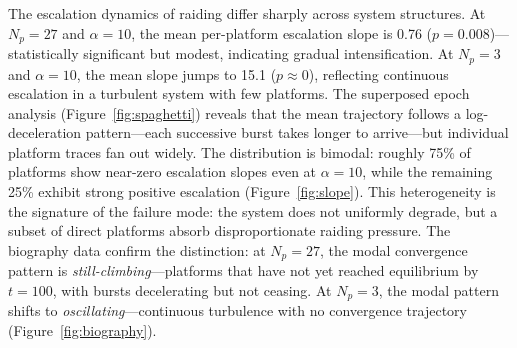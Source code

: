 
The escalation dynamics of raiding differ sharply across system structures. At $N_p = 27$ and $\alpha = 10$, the mean per-platform escalation slope is 0.76 ($p = 0.008$)---statistically significant but modest, indicating gradual intensification. At $N_p = 3$ and $\alpha = 10$, the mean slope jumps to 15.1 ($p \approx 0$), reflecting continuous escalation in a turbulent system with few platforms. The superposed epoch analysis (Figure~\ref{fig:spaghetti}) reveals that the mean trajectory follows a log-deceleration pattern---each successive burst takes longer to arrive---but individual platform traces fan out widely. The distribution is bimodal: roughly 75\% of platforms show near-zero escalation slopes even at $\alpha = 10$, while the remaining 25\% exhibit strong positive escalation (Figure~\ref{fig:slope}). This heterogeneity is the signature of the failure mode: the system does not uniformly degrade, but a subset of direct platforms absorb disproportionate raiding pressure. The biography data confirm the distinction: at $N_p = 27$, the modal convergence pattern is \textit{still-climbing}---platforms that have not yet reached equilibrium by $t = 100$, with bursts decelerating but not ceasing. At $N_p = 3$, the modal pattern shifts to \textit{oscillating}---continuous turbulence with no convergence trajectory (Figure~\ref{fig:biography}).


